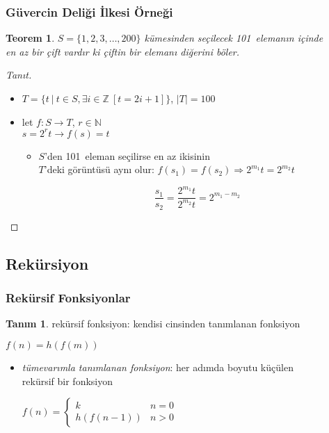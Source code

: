\documentclass[dvipsnames]{beamer}
\theoremstyle{definition}
\newtheorem{tanim}[theorem]{Tanım}
\theoremstyle{example}
\theoremstyle{plain}
\newtheorem{teorem}[theorem]{Teorem}
\begin{document}
\begin{frame}
  \frametitle{Güvercin Deliği İlkesi Örneği}

  \begin{teorem}
    $S = \{1,2,3,\dots,200\}$ kümesinden seçilecek 101~elemanın içinde\\
    en az bir çift vardır ki çiftin bir elemanı diğerini böler.
  \end{teorem}

  \pause
  \begin{proof}[Tanıt]
    \begin{itemize}
      \item $T=\{t~|~t \in S, \exists i \in \mathbb{Z}~[t=2i+1]\}$, $|T|=100$

      \pause
      \item let $f: S \rightarrow T$, $r \in \mathbb{N}$\\
        $s = 2^r t \rightarrow f(s) = t$
      \begin{itemize}
        \item $S$'den 101~eleman seçilirse en az ikisinin\\
          $T$'deki görüntüsü aynı olur:
          $f(s_1)=f(s_2) \Rightarrow 2^{m_1} t = 2^{m_2} t$

        \pause
        \[
          \frac {s_1} {s_2} = \frac {2^{m_1} t} {2^{m_2} t} = 2^{m_1 - m_2}
        \]
      \end{itemize}
    \end{itemize}
  \end{proof}
\end{frame}

\subsection{Rekürsiyon}

\begin{frame}
  \frametitle{Rekürsif Fonksiyonlar}

  \begin{tanim}
    \alert{rekürsif fonksiyon}: kendisi cinsinden tanımlanan fonksiyon

    \medskip
    $f(n) = h(f(m))$
  \end{tanim}

  \begin{itemize}
    \item \emph{tümevarımla tanımlanan fonksiyon}: her adımda boyutu küçülen\\
      rekürsif bir fonksiyon

    \medskip
    $f(n) = \left\{
      \begin{array}{ll}
        k         & n = 0\\
        h(f(n-1)) & n > 0
      \end{array}
    \right.$
  \end{itemize}
\end{frame}
\end{document}

